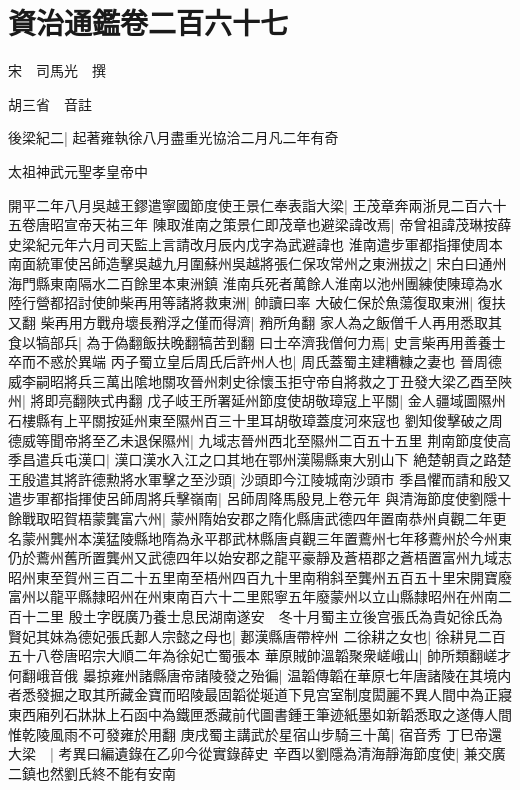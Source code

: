 \section{資治通鑑卷二百六十七}
宋　司馬光　撰

胡三省　音註

後梁紀二|{
	起著雍執徐八月盡重光協洽二月凡二年有奇}


太祖神武元聖孝皇帝中

開平二年八月吳越王鏐遣寧國節度使王景仁奉表詣大梁|{
	王茂章奔兩浙見二百六十五卷唐昭宣帝天祐三年}
陳取淮南之策景仁即茂章也避梁諱改焉|{
	帝曾祖諱茂琳按薛史梁紀元年六月司天監上言請改月辰内戊字為武避諱也}
淮南遣步軍都指揮使周本南面統軍使呂師造擊吳越九月圍蘇州吳越將張仁保攻常州之東洲拔之|{
	宋白曰通州海門縣東南隔水二百餘里本東洲鎮}
淮南兵死者萬餘人淮南以池州團練使陳璋為水陸行營都招討使帥柴再用等諸將救東洲|{
	帥讀曰率}
大破仁保於魚蕩復取東洲|{
	復扶又翻}
柴再用方戰舟壞長矟浮之僅而得濟|{
	矟所角翻}
家人為之飯僧千人再用悉取其食以犒部兵|{
	為于偽翻飯扶晚翻犒苦到翻}
曰士卒濟我僧何力焉|{
	史言柴再用善養士卒而不惑於異端}
丙子蜀立皇后周氏后許州人也|{
	周氏蓋蜀主建糟糠之妻也}
晉周德威李嗣昭將兵三萬出隂地關攻晉州刺史徐懷玉拒守帝自將救之丁丑發大梁乙酉至陜州|{
	將即亮翻陜式冉翻}
戊子岐王所署延州節度使胡敬璋寇上平關|{
	金人疆域圖隰州石樓縣有上平關按延州東至隰州百三十里耳胡敬璋蓋度河來寇也}
劉知俊擊破之周德威等聞帝將至乙未退保隰州|{
	九域志晉州西北至隰州二百五十五里}
荆南節度使高季昌遣兵屯漢口|{
	漢口漢水入江之口其地在鄂州漢陽縣東大别山下}
絶楚朝貢之路楚王殷遣其將許德勲將水軍擊之至沙頭|{
	沙頭即今江陵城南沙頭市}
季昌懼而請和殷又遣步軍都指揮使呂師周將兵擊嶺南|{
	呂師周降馬殷見上卷元年}
與清海節度使劉隱十餘戰取昭賀梧蒙龔富六州|{
	蒙州隋始安郡之隋化縣唐武德四年置南恭州貞觀二年更名蒙州龔州本漢猛陵縣地隋為永平郡武林縣唐貞觀三年置鷰州七年移鷰州於今州東仍於鷰州舊所置龔州又武德四年以始安郡之龍平豪靜及蒼梧郡之蒼梧置富州九域志昭州東至賀州三百二十五里南至梧州四百九十里南稍斜至龔州五百五十里宋開寶廢富州以龍平縣隸昭州在州東南百六十二里熙寧五年廢蒙州以立山縣隸昭州在州南二百十二里}
殷土字旣廣乃養士息民湖南遂安　冬十月蜀主立後宫張氏為貴妃徐氏為賢妃其妹為德妃張氏郪人宗懿之母也|{
	郪漢縣唐帶梓州}
二徐耕之女也|{
	徐耕見二百五十八卷唐昭宗大順二年為徐妃亡蜀張本}
華原賊帥溫韜聚衆嵯峨山|{
	帥所類翻嵯才何翻峨音俄}
㬥掠雍州諸縣唐帝諸陵發之殆徧|{
	温韜傳韜在華原七年唐諸陵在其境内者悉發掘之取其所藏金寶而昭陵最固韜從埏道下見宫室制度閎麗不異人間中為正寢東西廂列石牀牀上石函中為鐵匣悉藏前代圖書鍾王筆迹紙墨如新韜悉取之遂傳人間惟乾陵風雨不可發雍於用翻}
庚戌蜀主講武於星宿山步騎三十萬|{
	宿音秀}
丁巳帝還大梁　|{
	考異曰編遺錄在乙卯今從實錄薛史}
辛酉以劉隱為清海靜海節度使|{
	兼交廣二鎮也然劉氏終不能有安南}
